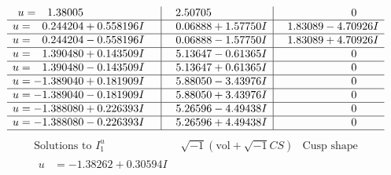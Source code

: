 \documentclass[1p]{elsarticle_modified}
\theoremstyle{definition}
\newcommand{\I}{\sqrt{-1}}
\begin{document}
$$\begin{array}{c|c|c}
\begin{aligned}
u &= \phantom{-}1.38005\phantom{ +0.000000I}\end{aligned}
 & \phantom{-}2.50705\phantom{ +0.000000I} & \phantom{-0.000000 } 0 \\ \hline\begin{aligned}
u &= \phantom{-}0.244204 + 0.558196 I\end{aligned}
 & \phantom{-}0.06888 + 1.57750 I & \phantom{-}1.83089 - 4.70926 I \\ \hline\begin{aligned}
u &= \phantom{-}0.244204 - 0.558196 I\end{aligned}
 & \phantom{-}0.06888 - 1.57750 I & \phantom{-}1.83089 + 4.70926 I \\ \hline\begin{aligned}
u &= \phantom{-}1.390480 + 0.143509 I\end{aligned}
 & \phantom{-}5.13647 - 0.61365 I & \phantom{-0.000000 } 0 \\ \hline\begin{aligned}
u &= \phantom{-}1.390480 - 0.143509 I\end{aligned}
 & \phantom{-}5.13647 + 0.61365 I & \phantom{-0.000000 } 0 \\ \hline\begin{aligned}
u &= -1.389040 + 0.181909 I\end{aligned}
 & \phantom{-}5.88050 - 3.43976 I & \phantom{-0.000000 } 0 \\ \hline\begin{aligned}
u &= -1.389040 - 0.181909 I\end{aligned}
 & \phantom{-}5.88050 + 3.43976 I & \phantom{-0.000000 } 0 \\ \hline\begin{aligned}
u &= -1.388080 + 0.226393 I\end{aligned}
 & \phantom{-}5.26596 - 4.49438 I & \phantom{-0.000000 } 0 \\ \hline\begin{aligned}
u &= -1.388080 - 0.226393 I\end{aligned}
 & \phantom{-}5.26596 + 4.49438 I & \phantom{-0.000000 } 0\\
 \hline 
 \end{array}$$\newpage$$\begin{array}{c|c|c}  
\text{Solutions to }I^u_{1}& \I (\text{vol} + \sqrt{-1}CS) & \text{Cusp shape}\\
 \hline 
\begin{aligned}
u &= -1.38262 + 0.30594 I\end{aligned}

\end{array}$$
\end{document}
